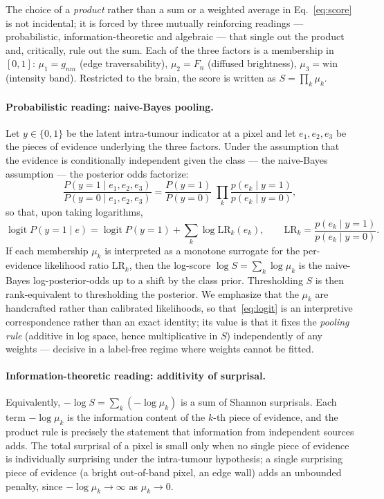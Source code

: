 \documentclass[11pt,a4paper]{article}
\begin{document}
The choice of a \emph{product} rather than a sum or a weighted average in
Eq.~\eqref{eq:score} is not incidental; it is forced by three mutually
reinforcing readings --- probabilistic, information-theoretic and algebraic ---
that single out the product and, critically, rule out the sum. Each of the three
factors is a membership in $[0,1]$: $\mu_1=g_{nm}$ (edge traversability),
$\mu_2=F_n$ (diffused brightness), $\mu_3=\mathrm{win}$ (intensity band).
Restricted to the brain, the score is written as $S=\prod_{k} \mu_k$.

\paragraph{Probabilistic reading: naive-Bayes pooling.} Let $y\in\{0,1\}$ be the
latent intra-tumour indicator at a pixel and let $e_1,e_2,e_3$ be the pieces of
evidence underlying the three factors. Under the assumption that the evidence is
conditionally independent given the class --- the naive-Bayes assumption --- the
posterior odds factorize:
\begin{equation}
\frac{P(y{=}1\mid e_1,e_2,e_3)}{P(y{=}0\mid e_1,e_2,e_3)}
=\frac{P(y{=}1)}{P(y{=}0)}\;\prod_{k}\frac{p(e_k\mid y{=}1)}{p(e_k\mid y{=}0)},
\label{eq:naivebayes}
\end{equation}
so that, upon taking logarithms,
\begin{equation}
\operatorname{logit}P(y{=}1\mid e)=\operatorname{logit}P(y{=}1)+\sum_{k}\log \mathrm{LR}_k(e_k),
\qquad \mathrm{LR}_k=\frac{p(e_k\mid y{=}1)}{p(e_k\mid y{=}0)}.
\label{eq:logit}
\end{equation}
If each membership $\mu_k$ is interpreted as a monotone surrogate for the
per-evidence likelihood ratio $\mathrm{LR}_k$, then the log-score
$\log S=\sum_k \log \mu_k$ is the naive-Bayes log-posterior-odds up to a shift by
the class prior. Thresholding $S$ is then rank-equivalent to thresholding the
posterior. We emphasize that the $\mu_k$ are handcrafted rather than calibrated
likelihoods, so that~\eqref{eq:logit} is an interpretive correspondence rather
than an exact identity; its value is that it fixes the \emph{pooling rule}
(additive in log space, hence multiplicative in $S$) independently of any weights
--- decisive in a label-free regime where weights cannot be fitted.

\paragraph{Information-theoretic reading: additivity of surprisal.} Equivalently,
$-\log S=\sum_k(-\log\mu_k)$ is a sum of Shannon surprisals. Each term
$-\log\mu_k$ is the information content of the $k$-th piece of evidence, and the
product rule is precisely the statement that information from independent sources
adds. The total surprisal of a pixel is small only when no single piece of
evidence is individually surprising under the intra-tumour hypothesis; a single
surprising piece of evidence (a bright out-of-band pixel, an edge wall) adds an
unbounded penalty, since $-\log\mu_k\to\infty$ as $\mu_k\to0$.
\end{document}
